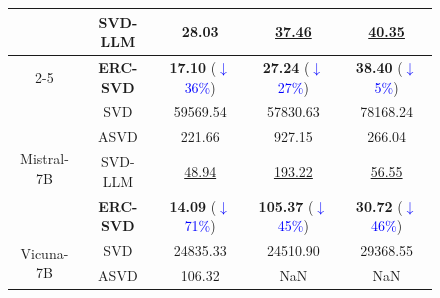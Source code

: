 \begin{figure}[h]
\begin{minipage}[t]{0.455\textwidth}
{\begin{tabular}{c|c|ccc}
                                              & \cellcolor{white} SVD-LLM & \cellcolor{white} 28.03 & \cellcolor{white} \underline{37.46} & \cellcolor{white} \underline{40.35} \\
        \cmidrule{2-5} 
                                              & \cellcolor{cyan!10} \textbf{ERC-SVD} & \cellcolor{cyan!10} \textbf{17.10} (\textcolor{blue}{$\downarrow$36\%}) & \cellcolor{cyan!10} \textbf{27.24} (\textcolor{blue}{$\downarrow$27\%}) & \cellcolor{cyan!10} \textbf{38.40} (\textcolor{blue}{$\downarrow$5\%}) \\
        \midrule
            \multirow{4}{*}{Mistral-7B} & \cellcolor{white} SVD & \cellcolor{white} 59569.54 & \cellcolor{white} 57830.63 & \cellcolor{white} 78168.24\\
    
                                                & \cellcolor{white} ASVD & \cellcolor{white} 221.66 & \cellcolor{white} 927.15 & \cellcolor{white} 266.04\\
                  
                                                & \cellcolor{white} SVD-LLM & \cellcolor{white} \underline{48.94} & \cellcolor{white} \underline{193.22} & \cellcolor{white} \underline{56.55}\\
        \cmidrule{2-5}  
                                                & \cellcolor{cyan!10} \textbf{ERC-SVD} & \cellcolor{cyan!10} \textbf{14.09} (\textcolor{blue}{$\downarrow$71\%}) & \cellcolor{cyan!10} \textbf{105.37} (\textcolor{blue}{$\downarrow$45\%}) & \cellcolor{cyan!10} \textbf{30.72} (\textcolor{blue}{$\downarrow$46\%})\\
        \midrule
            \multirow{4}{*}{Vicuna-7B} & \cellcolor{white} SVD & \cellcolor{white} 24835.33 & \cellcolor{white} 24510.90 & \cellcolor{white} 29368.55\\
    
                                               & \cellcolor{white} ASVD & \cellcolor{white} 106.32 & \cellcolor{white} NaN & \cellcolor{white} NaN\\
                  

\end{tabular}}
\end{minipage}
\end{figure}
